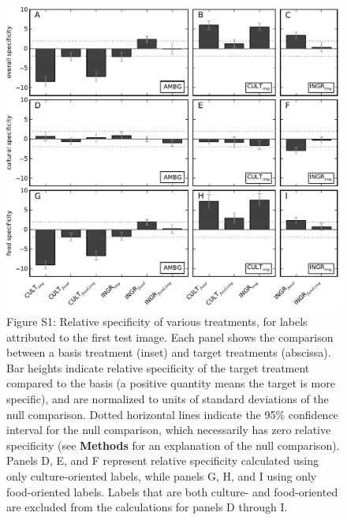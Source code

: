 \documentclass[a4paper]{report}
\begin{document}
\begin{figure}
	\includegraphics{figs/specificity-test0.pdf}
	\caption*{Figure S1: Relative specificity of various treatments, for labels attributed
		to the first test image.
		Each panel shows the comparison between a basis treatment (inset) and 
		target treatments (abscissa).
		Bar heights indicate relative specificity of the target 
		treatment compared to the basis (a positive quantity means the target 
		is more specific), and are normalized to units of standard 
		deviations of the null comparison.  Dotted horizontal lines indicate
		the 95\% confidence interval for the null comparison, which necessarily
		has zero relative specificity (see \textbf{Methods} 
		for an explanation of the null comparison).  Panels D, E, and F 
		represent relative specificity calculated using only culture-oriented
		labels, while panels G, H, and I using only food-oriented labels.
		Labels that are both culture- and food-oriented are excluded from the
		calculations for panels D through I.
		}
	\end{figure}
\end{document}
